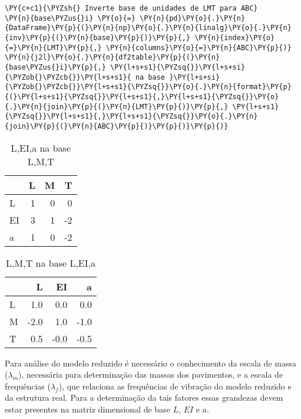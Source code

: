 \begin{tcolorbox}[breakable, size=fbox, boxrule=1pt, pad at break*=1mm,colback=cellbackground, colframe=cellborder]
\begin{Verbatim}[commandchars=\\\{\}]
\PY{c+c1}{\PYZsh{} Inverte base de unidades de LMT para ABC}
\PY{n}{base\PYZus{}i} \PY{o}{=} \PY{n}{pd}\PY{o}{.}\PY{n}{DataFrame}\PY{p}{(}\PY{n}{np}\PY{o}{.}\PY{n}{linalg}\PY{o}{.}\PY{n}{inv}\PY{p}{(}\PY{n}{base}\PY{p}{)}\PY{p}{,} \PY{n}{index}\PY{o}{=}\PY{n}{LMT}\PY{p}{,} \PY{n}{columns}\PY{o}{=}\PY{n}{ABC}\PY{p}{)}
\PY{n}{j2l}\PY{o}{.}\PY{n}{df2table}\PY{p}{(}\PY{n}{base\PYZus{}i}\PY{p}{,} \PY{l+s+s1}{\PYZsq{}}\PY{l+s+si}{\PYZob{}\PYZcb{}}\PY{l+s+s1}{ na base }\PY{l+s+si}{\PYZob{}\PYZcb{}}\PY{l+s+s1}{\PYZsq{}}\PY{o}{.}\PY{n}{format}\PY{p}{(}\PY{l+s+s1}{\PYZsq{}}\PY{l+s+s1}{,}\PY{l+s+s1}{\PYZsq{}}\PY{o}{.}\PY{n}{join}\PY{p}{(}\PY{n}{LMT}\PY{p}{)}\PY{p}{,} \PY{l+s+s1}{\PYZsq{}}\PY{l+s+s1}{,}\PY{l+s+s1}{\PYZsq{}}\PY{o}{.}\PY{n}{join}\PY{p}{(}\PY{n}{ABC}\PY{p}{)}\PY{p}{)}\PY{p}{)}
\end{Verbatim}
\end{tcolorbox}

    
    \begin{table}[H]
    \centering
    \caption{L,EI,a na base L,M,T}
    {\begin{tabular}{lrrr}
\toprule
{} &  L &  M &  T \\
\midrule
L  &  1 &  0 &  0 \\
EI &  3 &  1 & -2 \\
a  &  1 &  0 & -2 \\
\bottomrule
\end{tabular}
}
    \label{}
    \end{table}
    

    
    
    \begin{table}[H]
    \centering
    \caption{L,M,T na base L,EI,a}
    {\begin{tabular}{lrrr}
\toprule
{} &    L &   EI &    a \\
\midrule
L &  1.0 &  0.0 &  0.0 \\
M & -2.0 &  1.0 & -1.0 \\
T &  0.5 & -0.0 & -0.5 \\
\bottomrule
\end{tabular}
}
    \label{}
    \end{table}
    

    
    Para análise do modelo reduzido é necessário o conhecimento da escala de
massa (\(\lambda_m\)), necessária para determinação das massas dos
pavimentos, e a escala de frequências (\(\lambda_f\)), que relaciona as
frequências de vibração do modelo reduzido e da estrutura real. Para a
determinação da tais fatores essas grandezas devem estar presentes na
matriz dimensional de base \(L\), \(EI\) e \(a\).

